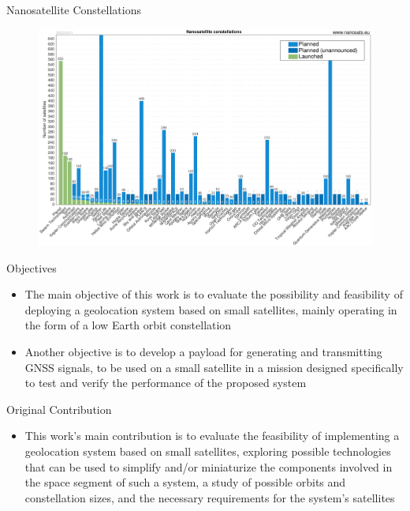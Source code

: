 \begin{frame}{Nanosatellite Constellations}

    \begin{figure}[!ht]
        \begin{center}
            \includegraphics[width=0.9\columnwidth]{figures/Nanosats_constellations_2023-05-31}
        \end{center}
    \end{figure}

\end{frame}

\begin{frame}{Objectives}

    \begin{itemize}
        \item The main objective of this work is to evaluate the possibility and feasibility of deploying a geolocation system based on small satellites, mainly operating in the form of a low Earth orbit constellation
        \vspace{0.3cm}
        \item Another objective is to develop a payload for generating and transmitting GNSS signals, to be used on a small satellite in a mission designed specifically to test and verify the performance of the proposed system
    \end{itemize}

\end{frame}

\begin{frame}{Original Contribution}

    \begin{itemize}
        \item This work's main contribution is to evaluate the feasibility of implementing a geolocation system based on small satellites, exploring possible technologies that can be used to simplify and/or miniaturize the components involved in the space segment of such a system, a study of possible orbits and constellation sizes, and the necessary requirements for the system's satellites
    \end{itemize}

\end{frame}
